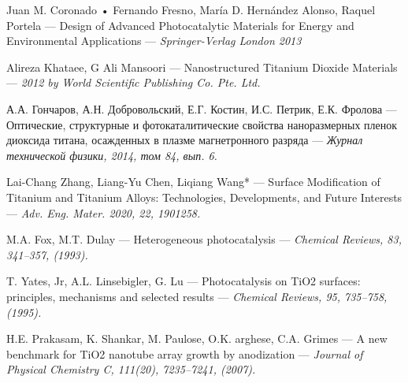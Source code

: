 \documentclass[oneside,final,12pt]{extreport}
\begin{document}

\newpage
\begin{thebibliography}{}

      Juan M. Coronado • Fernando Fresno, María D. Hernández Alonso,
Raquel Portela --- Design of Advanced Photocatalytic Materials for Energy and Environmental Applications --- \it{Springer-Verlag London 2013} \normalfont

      Alireza Khataee, G Ali Mansoori  ---  Nanostructured Titanium Dioxide Materials --- \it{2012 by World Scientific Publishing Co. Pte. Ltd.
} \normalfont
    
      А.А. Гончаров, А.Н. Добровольский, Е.Г. Костин, И.С. Петрик, Е.К. Фролова  ---  Оптические, структурные и фотокаталитические свойства наноразмерных пленок диоксида титана, осажденных в плазме магнетронного разряда --- \it {Журнал технической физики, 2014, том 84, вып. 6}. \normalfont
    
     Lai-Chang Zhang, Liang-Yu Chen, Liqiang Wang*  ---  Surface Modification of Titanium and Titanium Alloys: Technologies, Developments, and Future Interests --- \it {Adv. Eng. Mater. 2020, 22, 1901258}. \normalfont
    
     M.A. Fox, M.T. Dulay --- Heterogeneous photocatalysis --- \it{Chemical Reviews, 83, 341–357, (1993)}. \normalfont
    
     T. Yates, Jr, A.L. Linsebigler, G. Lu --- Photocatalysis on TiO2 surfaces: principles, mechanisms and selected results --- \it{Chemical Reviews, 95, 735–758, (1995)}. \normalfont
    
     H.E. Prakasam, K. Shankar, M. Paulose, O.K. arghese, C.A. Grimes --- A new benchmark for TiO2 nanotube array growth by anodization --- \it{Journal of Physical Chemistry C, 111(20), 7235–7241, (2007)}. \normalfont
    
\end{thebibliography}
\end{document}
